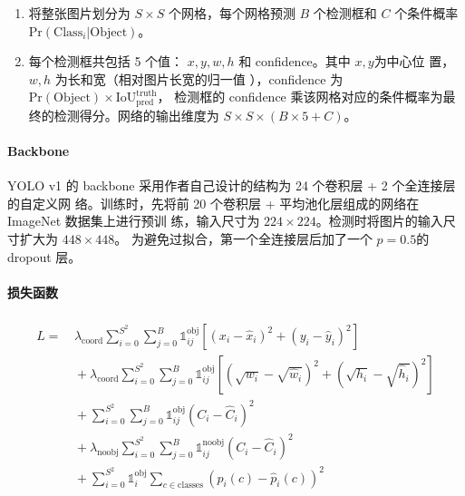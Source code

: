 \begin{enumerate}
  \item 将整张图片划分为 $S \times S$ 个网格，每个网格预测 $ B $ 个检测框和 $ C $
    个条件概率 $ \mathrm{Pr}(\mathrm{Class}_i|\mathrm{Object}) $。
  \item 每个检测框共包括 5 个值： $x, y, w, h$ 和 confidence。其中 $x, y$为中心位
    置，$w, h$ 为长和宽（相对图片长宽的归一值
    ），confidence 为$\mathrm{Pr}(\mathrm{Object}) \times
    \mathrm{IoU}^{\mathrm{truth}}_{\mathrm{pred}}$，
    检测框的 confidence 乘该网格对应的条件概率为最终的检测得分。网络的输出维度为 $ S
    \times S \times (B \times 5 + C) $。
\end{enumerate}

\paragraph{Backbone}

YOLO v1 的 backbone 采用作者自己设计的结构为 24 个卷积层 + 2 个全连接层的自定义网
络。训练时，先将前 20 个卷积层 + 平均池化层组成的网络在 ImageNet 数据集上进行预训
练，输入尺寸为 $224 \times 224$。检测时将图片的输入尺寸扩大为 $448 \times 448$。
为避免过拟合，第一个全连接层后加了一个 $p=0.5$的 dropout 层。

\paragraph{损失函数}

\begin{align}
  \label{equ:yolo-v1-loss}
  \begin{split}
    L = & \, \lambda_{\mathrm{coord}} \sum_{i=0}^{S^2} \sum_{j=0}^{B} \mathds{1}_{ij}^{\mathrm{obj}} \left [ \left (x_i - \hat{x}_i \right )^2 + \left (y_i - \hat{y}_i \right )^2 \right ] \\
    & \, + \lambda_{\mathrm{coord}} \sum_{i=0}^{S^2} \sum_{j=0}^{B} \mathds{1}_{ij}^{\mathrm{obj}} \left [ \left(\sqrt{w_i} - \sqrt{\hat{w}_i} \right)^2 + \left (\sqrt{h_i} - \sqrt{\hat{h}_i} \right )^2 \right ]  \\
    & \, + \sum_{i=0}^{S^2} \sum_{j=0}^{B} \mathds{1}_{ij}^{\mathrm{obj}} \left( C_i - \hat{C}_i \right)^2  \\
    & \, + \lambda_{\mathrm{noobj}} \sum_{i=0}^{S^2} \sum_{j=0}^{B} \mathds{1}_{ij}^{\mathrm{noobj}} \left( C_i - \hat{C}_i \right)^2  \\
    & \, + \sum_{i=0}^{S^2} \mathds{1}_{i}^{\mathrm{obj}} \sum_{c \in \mathrm{classes}} \left( p_i(c) - \hat{p}_i(c) \right)^2
  \end{split}
\end{align}

